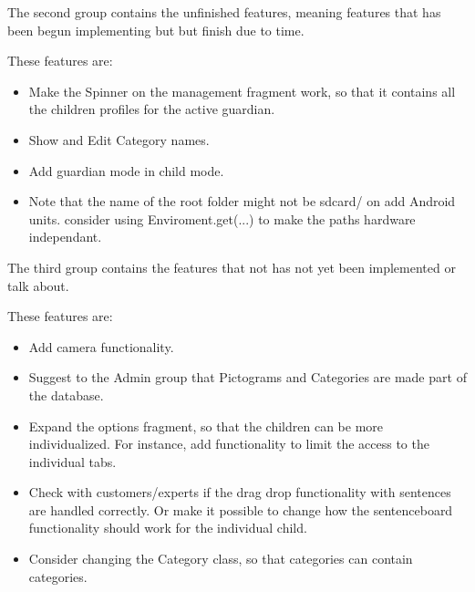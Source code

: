 The second group contains the unfinished features, meaning features that has been begun implementing but but finish due to time.   

These features are:

\begin{itemize}
	\item Make the Spinner on the management fragment work, so that it contains all the children profiles for the active guardian.
	\item Show and Edit Category names.
	\item Add guardian mode in child mode.
	\item Note that the name of the root folder might not be sdcard/ on add Android units.
		\subitem consider using Enviroment.get(...) to make the paths hardware independant.
	
	
\end{itemize}


The third group contains the features that not has not yet been implemented or talk about.

These features are: 

\begin{itemize}
	\item Add camera functionality.
	\item Suggest to the Admin group that Pictograms and Categories are made part of the database.
	\item Expand the options fragment, so that the children can be more individualized.		
		\subitem For instance, add functionality to limit the access to the individual tabs.
		
	\item Check with customers/experts if the drag drop functionality with sentences are handled correctly.
		\subitem Or make it possible to change how the sentenceboard functionality should work for the individual child.
	\item Consider changing the Category class, so that categories can contain categories.
\end{itemize}  

